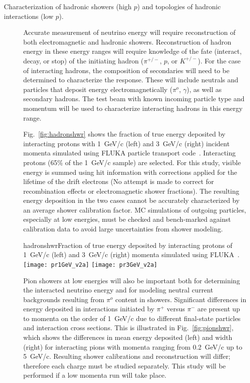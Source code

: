 \begin{description}
\item [Characterization of hadronic showers (high $p$) and topologies of hadronic interactions (low $p$).]


Accurate measurement of neutrino energy will require reconstruction of both electromagnetic and hadronic showers. Reconstruction of hadron energy 
in these energy ranges will require knowledge of the fate (interact, decay, or stop) of the initiating hadron ($\pi^{+/-}$, $p$, or $K^{+/-}$).
For the case of  interacting hadrons, the composition of secondaries
will need to be determined to characterize the response. 
These will include neutrals and particles that 
deposit energy electromagnetically ($\pi^o$, $\gamma$), as well as
secondary hadrons. The test beam with known incoming particle type and momentum will be used
to characterize interacting hadrons in this energy range.


Fig.~\ref{fig:hadronshwr} shows the fraction of true energy deposited by interacting protons with 1~GeV/c (left) and
3~GeV/c (right) incident momenta simulated using FLUKA particle transport code~\cite{fluka05}. 
Interacting protons (65\% of the 1~GeV/c sample) are selected.
For this study, visible energy is summed using hit information with corrections applied for the lifetime of 
the drift electrons (No attempt is made to correct for recombination effects or electromagnetic shower fractions). 
The resulting energy deposition in the two cases cannot be 
accurately characterized by an average shower calibration factor. MC simulations of 
outgoing particles, especially at low energies, must be checked and bench-marked against calibration data to avoid
large uncertainties from shower modeling. 

\begin{cdrfigure}{hadronshwr}{Fraction of true energy deposited by interacting protons of 1~GeV/c (left) and
3~GeV/c (right) momenta simulated using FLUKA~\cite{fluka05}.}
\texttt{[image: pr1GeV\_v2a]}
\texttt{[image: pr3GeV\_v2a]}
\end{cdrfigure}


Pion showers at low energies will also be important both for determining the interacted neutrino energy and for modeling neutral current backgrounds resulting from $\pi^o$ content in showers. Significant
 differences in energy deposited in interactions initiated by $\pi^+$ versus $\pi^-$  are present up to momenta on the order of 1~GeV/c due to different
final-state particles and interaction cross sections. This is illustrated in 
Fig.~\ref{fig:pionshwr}, which shows the differences in mean energy deposited (left) and width (right) 
for interacting pions with momenta ranging from 0.2~GeV/c up to 5~GeV/c.
Resulting shower calibrations and reconstruction will differ; therefore each charge must be 
studied separately. This study will be performed if a low momenta run will take place.  


\end{description}
